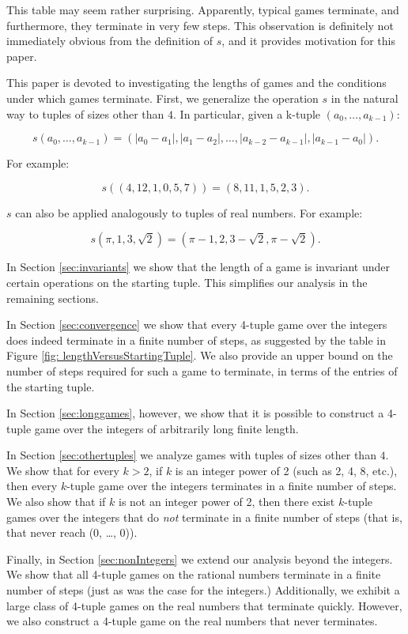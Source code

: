 \documentclass[12pt]{amsart}
\newcommand{\diff}{s}
\begin{document}
This table may seem rather surprising. Apparently, typical games terminate, and furthermore, they terminate in very few steps. This observation is definitely not immediately obvious from the definition of $\diff$, and it provides motivation for this paper.

This paper is devoted to investigating the lengths of games and the conditions under which games terminate. First, we generalize the operation $\diff$ in the natural way to tuples of sizes other than $4$. In particular, given a k-tuple $(a_0, \ldots, a_{k-1})$:

$$\diff(a_0, \ldots, a_{k-1}) = (|a_0 - a_1|, |a_1 - a_2|, \ldots, |a_{k-2} - a_{k-1}|, |a_{k-1} - a_0|).$$

For example:

$$\diff((4, 12, 1, 0, 5, 7)) = (8, 11, 1, 5, 2, 3).$$

$\diff$ can also be applied analogously to tuples of real numbers. For example:

$$\diff(\pi, 1, 3, \sqrt{2}) = (\pi - 1, 2, 3 - \sqrt{2}, \pi - \sqrt{2}).$$

In Section \ref{sec:invariants} we show that the length of a game is invariant under certain operations on the starting tuple. This simplifies our analysis in the remaining sections.

In Section \ref{sec:convergence} we show that every 4-tuple game over the integers does indeed terminate in a finite number of steps, as suggested by the table in Figure \ref{fig: lengthVersusStartingTuple}. We also provide an upper bound on the number of steps required for such a game to terminate, in terms of the entries of the starting tuple.

In Section \ref{sec:longgames}, however, we show that it is possible to construct a 4-tuple game over the integers of arbitrarily long finite length. 

In Section \ref{sec:othertuples} we analyze games with tuples of sizes other than $4$. We show that for every $k > 2$, if $k$ is an integer power of 2 (such as 2, 4, 8, etc.), then every $k$-tuple game over the integers terminates in a finite number of steps. We also show that if $k$ is not an integer power of 2, then there exist $k$-tuple games over the integers that do \textit{not} terminate in a finite number of steps (that is, that never reach (0, \ldots, 0)).

Finally, in Section \ref{sec:nonIntegers} we extend our analysis beyond the integers. We show that all 4-tuple games on the rational numbers terminate in a finite number of steps (just as was the case for the integers.) Additionally, we exhibit a large class of 4-tuple games on the real numbers that terminate quickly. However, we also construct a 4-tuple game on the real numbers that never terminates.
\end{document}
